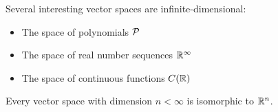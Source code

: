 \begin{applicationActivities}{3}{15}
\begin{observation}
  Several interesting vector spaces are infinite-dimensional:
  \begin{itemize}
    \item The space of polynomials \(\P\)
    \item The space of real number sequences \(\IR^\infty\)
    \item The space of continuous functions \(C(\IR)\)
  \end{itemize}
\end{observation}

\begin{fact}
  Every vector space with dimension \(n<\infty\) is isomorphic to \(\IR^n\).
\end{fact}

\end{applicationActivities}
